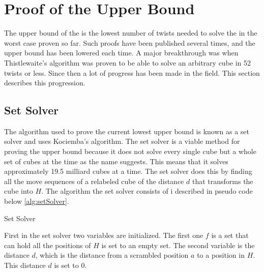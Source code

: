 \chapter{Proof of the Upper Bound}
The upper bound of the \rubik{} is the lowest number of twists needed to solve the \rubik{} in the worst case proven so far. Such proofs have been published several times, and the upper bound has been lowered each time. A major breakthrough was when Thistlewaite's algorithm was proven to be able to solve an arbitrary cube in 52 twists or less. Since then a lot of progress has been made in the field. This section describes this progression.

\section{Set Solver}
The algorithm used to prove the current lowest upper bound is known as a set solver and uses Kociemba's algorithm. The set solver is a viable method for proving the upper bound because it does not solve every single cube but a whole set of cubes at the time as the name suggests. This means that it solves approximately 19.5 milliard cubes at a time.
The set solver does this by finding all the move sequences of a relabeled cube of the distance $d$ that transforms the cube into $H$. 
The algorithm the set solver consists of i described in pseudo code below \ref{alg:setSolver}.%

\begin{algorithm}[!h]                     
\caption{Set Solver \cite{rokicki09}}          
\label{alg:setSolver}        
\begin{algorithmic}[1]
				\ENDIF
			\ENDFOR
		\ENDIF
		\ENDIF
	\ENDIF
\ENDWHILE
\end{algorithmic}
\end{algorithm}

First in the set solver two variables are initialized. The first one $f$ is a set that can hold all the positions of $H$ is set to an empty set. The second variable is the distance $d$, which is the distance from a scrambled position $a$ to a position in $H$. This distance $d$ is set to $0$.

